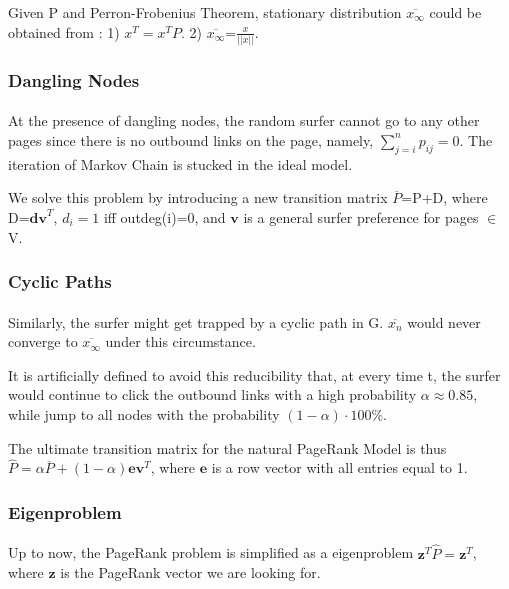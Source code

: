 \documentclass[a0,portrait]{a0poster}
\begin{document}
\begin{multicols}{2}
        Given P and Perron-Frobenius Theorem, stationary distribution $\overline{x_\infty}$ could be obtained from 
        : 1) $x^T=x^TP$.
          2) $\overline{x_\infty}$=$\frac{x}{||x||}$.
      
        \subsubsection*{Dangling Nodes}
        \paragraph{}
        At the presence of dangling nodes, the random surfer cannot go to any other pages since there is no outbound links on the page, namely, $\sum^n_{j=i}p_{ij}=0$. 
        The iteration of Markov Chain is stucked in the ideal model.
        
        We solve this problem by introducing a new transition matrix $\overline{P}$=P+D, where D=$\textbf{dv}^T$, $d_i=1$ iff outdeg(i)=0, and $\textbf{v}$ is a general surfer preference for pages $\in$ V.
        \subsubsection*{Cyclic Paths}
        \paragraph{}
        Similarly, the surfer might get trapped by a cyclic path in G. $\overline{x_n}$ would never converge to $\overline{x_\infty}$ under this circumstance.
        
        It is artificially defined to avoid this reducibility that, at every time t, the surfer would continue to click the outbound links with a high probability $\alpha\approx0.85$, while jump to all nodes with the probability $(1-\alpha)\cdot100\%$.
        
        The ultimate transition matrix for the natural PageRank Model is thus
        $\hat{P}=\alpha\overline{P}+(1-\alpha)\textbf{ev}^T$,
        where $\textbf{e}$ is a row vector with all entries equal to 1.
        \subsubsection*{Eigenproblem}
        \paragraph{}
        Up to now, the PageRank problem is simplified as a eigenproblem $\textbf{z}^T\hat{P}=\textbf{z}^T$, where $\textbf{z}$ is the PageRank vector we are looking for.
        

\end{multicols}
\end{document}

